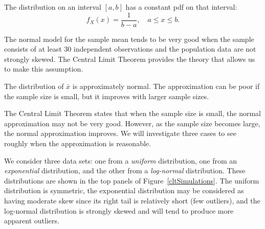 The  distribution on an interval $[a,b]$ has a constant pdf on that interval:
\[
	f_X(x)=\frac1{b-a},\quad a\le x\le b.
\]

The normal model for the sample mean tends to be very good when the sample consists of at least 30 independent observations and the population data are not strongly skewed. The Central Limit Theorem provides the theory that allows us to make this assumption.

\begin{termBox}{
The distribution of $\bar{x}$ is approximately normal. The approximation can be poor if the sample size is small, but it improves with larger sample sizes.}
\end{termBox}

The Central Limit Theorem states that when the sample size is small, the normal approximation may not be very good. However, as the sample size becomes large, the normal approximation improves. We will investigate three cases to see roughly when the approximation is reasonable.

We consider three data sets: one from a \emph{uniform} distribution, one from an \emph{exponential} distribution, and the other from a \emph{log-normal} distribution. These distributions are shown in the top panels of Figure~\ref{cltSimulations}. The uniform distribution is symmetric, the exponential distribution may be considered as having moderate skew since its right tail is relatively short (few outliers), and the log-normal distribution is strongly skewed and will tend to produce more apparent outliers.

